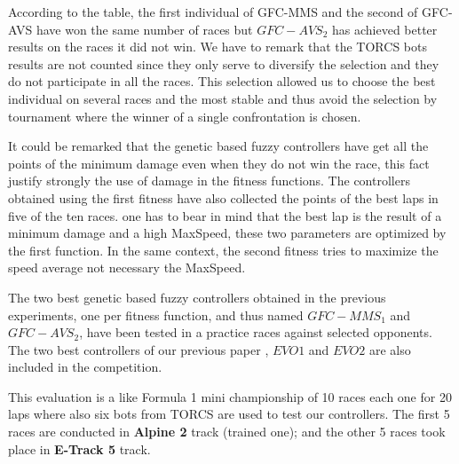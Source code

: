 \documentclass[conference]{IEEEtran}
\begin{document}

According to the table, the first individual of GFC-MMS and the second of GFC-AVS have won the same number of races but $GFC-AVS_2$ has achieved better results on the races it did not win.
We have to remark that the TORCS bots results are not counted since they only serve to diversify the selection and they do not participate in all the races.
This selection allowed us to choose the best individual on several races and the most stable and thus avoid the selection by tournament where the winner of a single confrontation is chosen.

It could be remarked that the genetic based fuzzy controllers have get all the points of the minimum damage even when they do not win the race, this fact  justify strongly the use of damage in the fitness functions.
The controllers obtained using the first fitness have also collected  the points of the best laps in  five of the ten races. one has to bear in mind that the best lap is the result of a minimum damage and a high MaxSpeed, these two parameters are optimized by the first function. In the same context, the second fitness tries to maximize the speed average  not necessary the MaxSpeed.

The two best genetic based fuzzy controllers obtained in the previous
experiments, one per fitness function, and thus named $GFC-MMS_1$ and
$GFC-AVS_2$, have been tested in a practice races against selected opponents. The two best controllers of our previous paper \cite{evo18}, $EVO1$ and $EVO2$ are also included in the competition.

This evaluation is a like Formula 1 mini championship of 10 races each one for 20 laps where also six bots from TORCS are used to test our controllers. The first 5 races are conducted in \textbf{Alpine 2} track (trained one); and the other 5 races took place in \textbf{E-Track 5} track.
\end{document}
